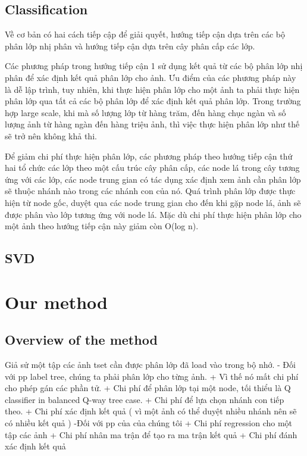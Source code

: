 \documentclass[preprint]{elsarticle}
\begin{document}
\subsection{Classification}
Về cơ bản có hai cách tiếp cập để giải quyết, hướng tiếp cận dựa trên các bộ phân lớp nhị phân và hướng tiếp cận dựa trên cây phân cấp các lớp.

Các phương pháp trong hướng tiếp cận 1 sử dụng kết quả từ các bộ phân lớp nhị phân để xác định kết quả phân lớp cho ảnh. Ưu điểm của các phương pháp này là dễ lập trình, tuy nhiên, khi thực hiện phân lớp cho một ảnh ta phải thực hiện phân lớp qua tất cả các bộ phân lớp để xác định kết quả phân lớp. Trong trường hợp large scale, khi mà số lượng lớp từ hàng trăm, đến hàng chục ngàn và số lượng ảnh từ hàng ngàn đến hàng triệu ảnh, thì việc thực hiện phân lớp như thế sẽ trở nên không khả thi.

Để giảm chi phí thực hiện phân lớp, các phương pháp theo hướng tiếp cận thứ hai tổ chức các lớp theo một cấu trúc cây phân cấp, các node lá trong cây tương ứng với các lớp, các node trung gian có tác dụng xác định xem ảnh cần phân lớp sẽ thuộc nhánh nào trong các nhánh con của nó. Quá trình phân lớp được thực hiện từ node gốc, duyệt qua các node trung gian cho đến khi gặp node lá, ảnh sẽ được phân vào lớp tương ứng với node lá. Mặc dù chi phí thực hiện phân lớp cho một ảnh theo hướng tiếp cận này giảm còn O(log n). 

\subsection{SVD}

\section{Our method}
\subsection{Overview of the method}

Giả sử một tập các ảnh tset cần được phân lớp đã load vào trong bộ nhớ. 
- Đối với pp label tree, chúng ta phải phân lớp cho từng ảnh. 
+ Vì thế nó mất chi phí cho phép gán các phần tử.
+ Chi phí để phân lớp tại một node, tối thiểu là Q classifier in balanced Q-way tree case.
+ Chi phí để lựa chọn nhánh con tiếp theo.
+ Chi phí xác định kết quả ( vì một ảnh có thể duyệt nhiều nhánh nên sẽ có nhiều kết quả )
-Đối với pp của của chúng tôi
+ Chi phí regression cho một tập các ảnh
+ Chi phí nhân ma trận để tạo ra ma trận kết quả
+ Chi phí đánh xác định kết quả 
 
\end{document}
